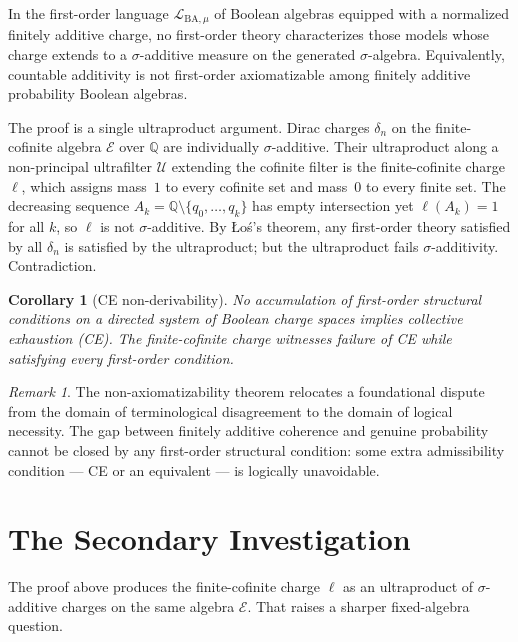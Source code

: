 \documentclass[11pt]{article}
\newtheorem{corollary}[theorem]{Corollary}
\theoremstyle{definition}
\theoremstyle{remark}
\newtheorem*{remark}{Remark}
\newcommand{\Lmu}{\mathcal{L}_{\mathrm{BA},\mu}}
\newcommand{\Q}{\mathbb{Q}}
\begin{document}
In the first-order language $\Lmu$ of Boolean algebras equipped with a normalized
finitely additive charge, no first-order theory characterizes those models whose
charge extends to a $\sigma$-additive measure on the generated $\sigma$-algebra.
Equivalently, countable additivity is not first-order axiomatizable among finitely
additive probability Boolean algebras.

The proof is a single ultraproduct argument. Dirac charges $\delta_n$ on the
finite-cofinite algebra $\mathcal{E}$ over $\Q$ are individually $\sigma$-additive.
Their ultraproduct along a non-principal ultrafilter $\mathcal{U}$ extending the
cofinite filter is the finite-cofinite charge $\ell$, which assigns mass~$1$ to
every cofinite set and mass~$0$ to every finite set. The decreasing sequence
$A_k = \Q\setminus\{q_0,\ldots,q_k\}$ has empty intersection yet $\ell(A_k)=1$
for all $k$, so $\ell$ is not $\sigma$-additive. By \L o\'s's theorem, any
first-order theory satisfied by all $\delta_n$ is satisfied by the ultraproduct;
but the ultraproduct fails $\sigma$-additivity. Contradiction.

\begin{corollary}[CE non-derivability]
No accumulation of first-order structural conditions on a directed system of Boolean
charge spaces implies collective exhaustion (CE). The finite-cofinite charge witnesses
failure of CE while satisfying every first-order condition.
\end{corollary}

\begin{remark}
The non-axiomatizability theorem relocates a foundational dispute from the domain of
terminological disagreement to the domain of logical necessity. The gap between
finitely additive coherence and genuine probability cannot be closed by any first-order
structural condition: some extra admissibility condition --- CE or an equivalent ---
is logically unavoidable.
\end{remark}

\section{The Secondary Investigation}

The proof above produces the finite-cofinite charge $\ell$ as an ultraproduct of
$\sigma$-additive charges on the same algebra $\mathcal{E}$. That raises a sharper
fixed-algebra question.
\end{document}
